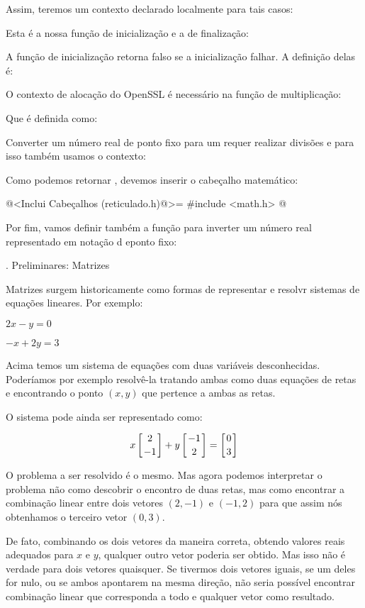 Assim, teremos um contexto declarado localmente para tais casos:


Esta é a nossa função de inicialização e a de finalização:


A função de inicialização retorna falso se a inicialização falhar. A
definição delas é:


O contexto de alocação do OpenSSL é necessário na função de
multiplicação:


Que é definida como:


Converter um número real de ponto fixo para um 
requer realizar divisões e para isso também usamos o contexto:


Como podemos retornar , devemos inserir o
cabeçalho matemático:

\iniciocodigo
@<Inclui Cabeçalhos (reticulado.h)@>=
#include <math.h>
@
\fimcodigo

Por fim, vamos definir também a função para inverter um número real
representado em notação d eponto fixo:



{\twelvebold {}. Preliminares: Matrizes}

Matrizes surgem historicamente como formas de representar e resolvr
sistemas de equações lineares. Por exemplo:

$2x-y=0$

$-x+2y=3$

Acima temos um sistema de equações com duas variáveis
desconhecidas. Poderíamos por exemplo resolvê-la tratando ambas como
duas equações de retas e encontrando o ponto $(x, y)$ que pertence a
ambas as retas.

O sistema pode ainda ser representado como:

$$x\left[{2\atop-1}\right]+y\left[-1\atop 2\right]=\left[0\atop3\right]$$

O problema a ser resolvido é o mesmo. Mas agora podemos interpretar o
problema não como descobrir o encontro de duas retas, mas como
encontrar a combinação linear entre dois vetores $(2, -1)$ e $(-1, 2)$
para que assim nós obtenhamos o terceiro vetor $(0, 3)$.

De fato, combinando os dois vetores da maneira correta, obtendo
valores reais adequados para $x$ e $y$, qualquer outro vetor poderia
ser obtido. Mas isso não é verdade para dois vetores quaisquer. Se
tivermos dois vetores iguais, se um deles for nulo, ou se ambos
apontarem na mesma direção, não seria possível encontrar combinação
linear que corresponda a todo e qualquer vetor como resultado.

